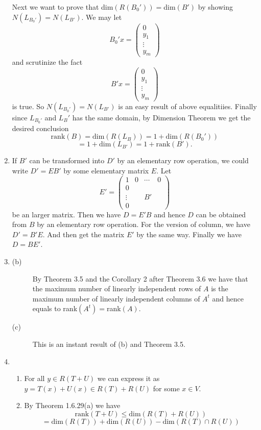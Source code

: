 \begin{enumerate}
Next we want to prove that dim$(R(B_0'))=$dim$(B')$ by showing $N(L_{B_0'})=N(L_{B'})$. We may let 
\[B_0'x=\begin{pmatrix}0\\y_1\\\vdots \\y_m\end{pmatrix}\]
and scrutinize the fact 
\[B'x=\begin{pmatrix}0\\y_1\\\vdots \\y_m\end{pmatrix}\]
is true. So $N(L_{B_0'})=N(L_{B'})$ is an easy result of above equalitiies. Finally since $L_{B_0'}$ and $L_B'$ has the same domain, by Dimension Theorem we get the desired conclusion
\[\mathrm{rank}(B)=\mathrm{dim}(R(L_B))=1+\mathrm{dim}(R(B_0'))\]
\[=1+\mathrm{dim}(L_{B'})=1+\mathrm{rank}(B').\]
\item If $B'$ can be transformed into $D'$ by an elementary row operation, we could write $D'=EB'$ by some elementary matrix $E$. Let 
\[E'=\left(\begin{array}{c|ccc}1&0&\cdots &0\\\hline 0&&&\\\vdots &&B'&\\0&&&\end{array}\right)\]
be an larger matrix. Then we have $D=E'B$ and hence $D$ can be obtained from $B$ by an elementary row operation. For the version of column, we have $D'=B'E$. And then get the matrix $E'$ by the same way. Finally we have $D=BE'$.
\item \begin{description}
\item[(b)] By Theorem 3.5 and the Corollary 2 after Theorem 3.6 we have that the maximum number of linearly independent rows of $A$ is the maximum number of linearly independent columns of $A^t$ and hence equals to rank$(A^t)=$rank$(A)$.
\item[(c)] This is an instant result of (b) and Theorem 3.5.
\end{description}
\item \begin{enumerate}
\item For all $y\in R(T+U)$ we can express it as $y=T(x)+U(x)\in R(T)+R(U)$ for some $x\in V$.
\item By Theorem 1.6.29(a) we have 
\[\mathrm{rank}(T+U)\leq \mathrm{dim}(R(T)+R(U))\]
\[=\mathrm{dim}(R(T))+\mathrm{dim}(R(U))-\mathrm{dim}(R(T)\cap R(U))\]

\end{enumerate}
\end{enumerate}
